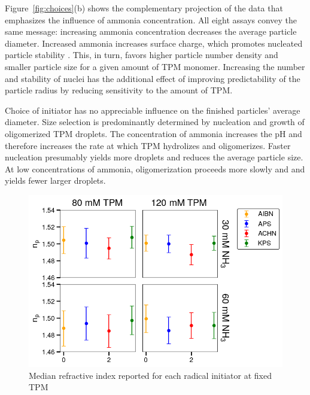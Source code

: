 \documentclass[journal=langd5,manuscript=article,layout=twocolumn]{achemso}
\begin{document}

Figure~\ref{fig:choices}(b) shows the complementary projection
of the data that emphasizes the influence of
ammonia concentration. 
All eight assays convey the same message:
increasing ammonia concentration
decreases the average particle diameter.
Increased ammonia increases surface charge, 
which promotes nucleated particle stability \cite{vanderwel17}. 
This, in turn, favors higher particle number density 
and smaller particle size for a given amount of TPM monomer.
Increasing the number and stability of nuclei 
has the additional effect of improving predictability
of the particle radius by reducing sensitivity to the amount
of TPM.

Choice of initiator has no appreciable 
influence on the finished particles'
average diameter.
Size selection is predominantly 
determined by nucleation and growth of
oligomerized TPM droplets.
The concentration of ammonia increases the pH and
therefore increases the rate at which TPM hydrolizes and oligomerizes. Faster nucleation
presumably yields more droplets and reduces the average particle size.
At low concentrations of ammonia, 
oligomerization proceeds more slowly and
and yields fewer larger droplets.

\begin{figure}[!t]
    \centering
    \includegraphics[width=\columnwidth]{longitudinal_np.png}
    \caption{Median refractive index reported for each radical initiator
    at fixed TPM}
    \label{fig:longitudinal_np}
\end{figure}
\end{document}
